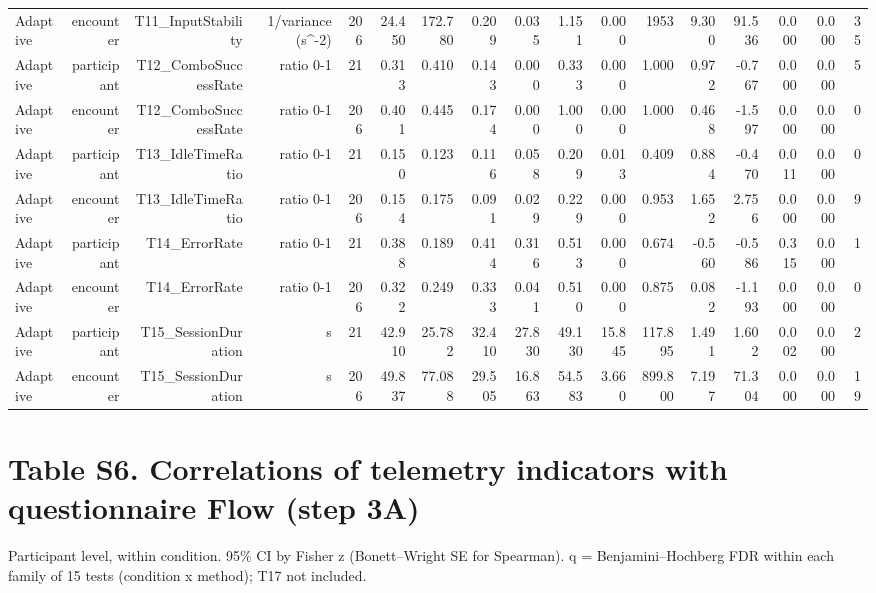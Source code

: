 \documentclass[10pt]{article}
\begin{document}
{\begin{longtable}{lrrrrrrrrrrrrrrrr}
Adaptive & encounter & T11\_InputStability & 1/variance (s\textasciicircum{}-2) & 206 & 24.450 & 172.780 & 0.209 & 0.035 & 1.151 & 0.000 & 1953 & 9.300 & 91.536 & 0.000 & 0.000 & 35 \\
Adaptive & participant & T12\_ComboSuccessRate & ratio 0-1 & 21 & 0.313 & 0.410 & 0.143 & 0.000 & 0.333 & 0.000 & 1.000 & 0.972 & -0.767 & 0.000 & 0.000 & 5 \\
Adaptive & encounter & T12\_ComboSuccessRate & ratio 0-1 & 206 & 0.401 & 0.445 & 0.174 & 0.000 & 1.000 & 0.000 & 1.000 & 0.468 & -1.597 & 0.000 & 0.000 & 0 \\
Adaptive & participant & T13\_IdleTimeRatio & ratio 0-1 & 21 & 0.150 & 0.123 & 0.116 & 0.058 & 0.209 & 0.013 & 0.409 & 0.884 & -0.470 & 0.011 & 0.000 & 0 \\
Adaptive & encounter & T13\_IdleTimeRatio & ratio 0-1 & 206 & 0.154 & 0.175 & 0.091 & 0.029 & 0.229 & 0.000 & 0.953 & 1.652 & 2.756 & 0.000 & 0.000 & 9 \\
Adaptive & participant & T14\_ErrorRate & ratio 0-1 & 21 & 0.388 & 0.189 & 0.414 & 0.316 & 0.513 & 0.000 & 0.674 & -0.560 & -0.586 & 0.315 & 0.000 & 1 \\
Adaptive & encounter & T14\_ErrorRate & ratio 0-1 & 206 & 0.322 & 0.249 & 0.333 & 0.041 & 0.510 & 0.000 & 0.875 & 0.082 & -1.193 & 0.000 & 0.000 & 0 \\
Adaptive & participant & T15\_SessionDuration & s & 21 & 42.910 & 25.782 & 32.410 & 27.830 & 49.130 & 15.845 & 117.895 & 1.491 & 1.602 & 0.002 & 0.000 & 2 \\
Adaptive & encounter & T15\_SessionDuration & s & 206 & 49.837 & 77.088 & 29.505 & 16.863 & 54.583 & 3.660 & 899.800 & 7.197 & 71.304 & 0.000 & 0.000 & 19 \\
\bottomrule
\end{longtable}}

\section*{Table S6. Correlations of telemetry indicators with questionnaire Flow (step 3A)}
Participant level, within condition. 95\% CI by Fisher z (Bonett--Wright SE for Spearman). q = Benjamini--Hochberg FDR within each family of 15 tests (condition x method); T17 not included.
\end{document}
